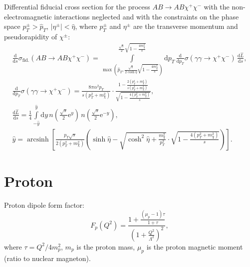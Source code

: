 \documentclass[a4paper,12pt]{article}
\newcommand{\abs}[1]{\lvert #1 \rvert}
\DeclareMathOperator{\arcsinh}{arcsinh}
\begin{document}
Differential fiducial cross section for the process $AB \to AB \chi^+ \chi^-$
with the non-electromagnetic interactions neglected and with the constraints on
the phase space $p_T^\pm > \hat p_T$, $\abs{\eta^\pm} < \hat \eta$, where
$p_T^\pm$ and $\eta^\pm$ are the transverse momentum and pseudorapidity of
$\chi^\pm$:
\begin{gather}
  \frac{\mathrm{d}}{\mathrm{d} s} \sigma_\text{fid.}(AB \to AB \chi^+ \chi^-)
  = \int\limits_{
      \max \left(
        \hat p_T,
        \frac{\sqrt{s}}{2 \cosh \hat \eta} \sqrt{1 - \frac{4 m_\chi^2}{s}}
      \right)
    }^{\frac{\sqrt{s}}{2} \sqrt{1 - \frac{4 m_\chi^2}{s}}}
      \mathrm{d} p_T
      \, \frac{\mathrm{d}}{\mathrm{d} p_T}
         \sigma(\gamma \gamma \to \chi^+ \chi^-)
      \, \frac{\mathrm{d} \hat L}{\mathrm{d} s},
  \\
  \frac{\mathrm{d}}{\mathrm{d} p_T} \sigma(\gamma \gamma \to \chi^+ \chi^-)
  = \frac{8 \pi \alpha^2 p_T}{s (p_T^2 + m_\chi^2)}
    \cdot \frac{1 - \frac{2 (p_T^4 + m_\chi^4)}{s (p_T^2 + m_\chi^2)}}
               {\sqrt{1 - \frac{4 (p_T^2 + m_\chi^2)}{s}}},
  \\
  \frac{\mathrm{d} \hat L}{\mathrm{d} s}
  = \frac14
    \int\limits_{-\hat y}^{\hat y} \mathrm{d} y
    \, n \left( \frac{\sqrt{s}}{2} \mathrm{e}^y \right)
    \, n \left( \frac{\sqrt{s}}{2} \mathrm{e}^{-y} \right),
  \\
  \hat y = \arcsinh \left[
    \frac{p_T \sqrt{s}}{2 (p_T^2 + m_\chi^2)} \left(
      \sinh \hat \eta
      - \sqrt{\cosh^2 \hat \eta + \frac{m_\chi^2}{p_T^2}}
        \cdot \sqrt{1 - \frac{4 (p_T^2 + m_\chi^2)}{s}}
    \right)
  \right].
\end{gather}

\section{Proton}

Proton dipole form factor:
\begin{equation}
  F_p(Q^2)
  = \frac{1 + \frac{(\mu_p - 1) \tau}{1 + \tau}}
         {\left( 1 + \frac{Q^2}{\Lambda^2} \right)^2},
\end{equation}
where $\tau = Q^2 / 4 m_p^2$, $m_p$ is the proton mass, $\mu_p$ is the proton
magnetic moment (ratio to nuclear magneton).
\end{document}
